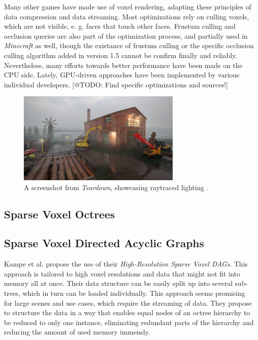 \noindent
Many other games have made use of voxel rendering, adapting these principles of data compression and data streaming. 
Most optimizations rely on culling voxels, which are not visible, e. g. faces that touch other faces.
Frustum culling and occlusion queries are also part of the optimization process, and partially used in \emph{Minecraft} 
as well, though the existance of frustum culling or the specific occlusion culling algorithm added in version 1.5 
cannot be confirm finally and reliably. Nevertheless, many efforts towards better performance have been made on the 
\ac{CPU} side. Lately, \ac{GPU}-driven approaches have been implemented by various individual developers. 
[@TODO: Find specific optimizations and sources!]  \\

\begin{figure}[h]
    \centering
    \includegraphics[width=300px]{images/graphics/teardown-ray-tracing.jpg}
    \caption{A screenshot from \emph{Teardown}, showcasing raytraced lighting \cite{TeardownSteam2022}.}
    \label{fig:teardown-raytracing}
\end{figure}

\subsection*{Sparse Voxel Octrees}

\subsection*{Sparse Voxel Directed Acyclic Graphs}

Kampe et al. \cite{Kampe2013} propose the use of their \emph{High-Resolution Sparse Voxel \ac{DAG}s}. This approach 
is tailored to high voxel resolutions and data that might not fit into memory all at once. Their data structure can 
be easily split up into several sub-trees, which in turn can be loaded individually. This approach seems promising 
for large scenes and use cases, which require the streaming of data. They propose to structure the data in a way that 
enables equal nodes of an octree hierarchy to be reduced to only one instance, eliminating redundant parts of the 
hierarchy and reducing the amount of used memory immensly. \\

